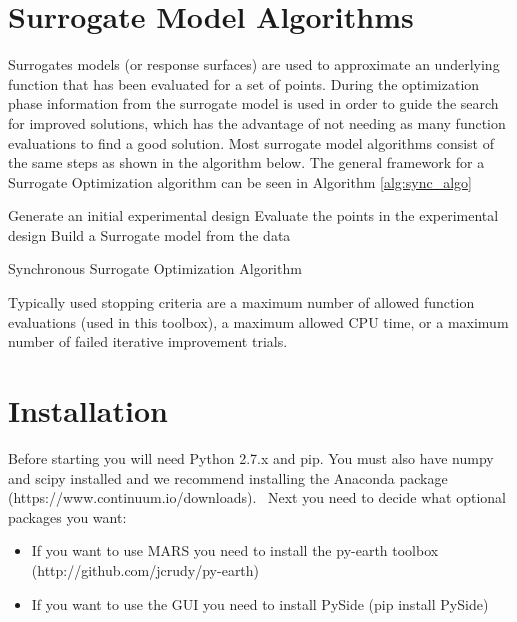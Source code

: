 \documentclass[]{article}
\begin{document}
\section{Surrogate Model Algorithms}
Surrogates models (or response surfaces) are used to approximate an underlying function that has been evaluated for a set of points. During the optimization phase information from the surrogate model is used in order to guide the search for improved solutions, which has the advantage of not needing as many function evaluations to find a good solution. Most surrogate model algorithms consist of the same steps as shown in the algorithm below.
The general framework for a Surrogate Optimization algorithm can be seen in Algorithm \ref{alg:sync_algo}

\begin{algorithm}[!h]
\LinesNumbered
{}


Generate an initial experimental design\;{\label{restart}}
Evaluate the points in the experimental design\;
Build a Surrogate model from the data\;
\caption{Synchronous Surrogate Optimization Algorithm}
\label{alg:sync_algo}
\end{algorithm} 

\noindent Typically used stopping criteria are a maximum number of allowed function evaluations (used in this toolbox), a maximum allowed CPU time, or a maximum number of failed iterative improvement trials.

\section{Installation}
Before starting you will need Python 2.7.x and pip. You must also have numpy and scipy installed and we recommend installing the Anaconda package \newline (https://www.continuum.io/downloads). \newline \ \newline Next you need to decide what optional packages you want:
\begin{itemize}
\item If you want to use MARS you need to install the py-earth toolbox \newline (http://github.com/jcrudy/py-earth)  
\item If you want to use the GUI you need to install PySide (pip install PySide)
\end{itemize}
\end{document}
